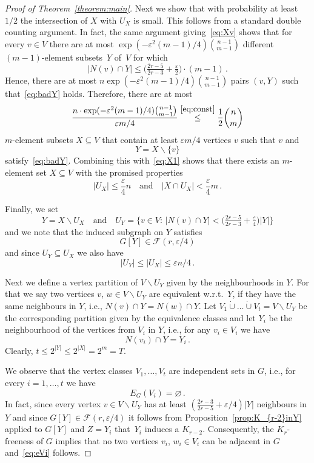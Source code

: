 \documentclass[reqno, 12pt]{amsart}
\theoremstyle{plain}
\theoremstyle{definition}
\let\eps=\varepsilon
\let\setminus=\smallsetminus
\let\emptyset=\varnothing
\begin{document}
\begin{proof}[Proof of Theorem~\ref{theorem:main}]
	Next we show that with probability at least $1/2$ the intersection 
	of $X$ with $U_X$ is small. This follows from a standard double counting argument.
	In fact, the same argument giving~\eqref{eq:Xv} shows that for every 
	$v\in V$ there are at most $\exp(-\eps^2(m-1)/4)\binom{n-1}{m-1}$
	different $(m-1)$-element subsets~$Y$ of~$V$ for which  
	\begin{equation}\label{eq:badY}
		|N(v)\cap Y|\leq\big(\tfrac{2r-5}{2r-3}+\tfrac{\eps}{2}\big)\cdot (m-1)\,.
	\end{equation}
	Hence, there are at most $n\exp(-\eps^2(m-1)/4)\binom{n-1}{m-1}$ pairs $(v,Y)$ 
	such that~\eqref{eq:badY}
	holds.
	Therefore, there are at most 
	\[
		\frac{n\cdot \exp(-\eps^2(m-1)/4)\binom{n-1}{m-1}}{\eps m/4}\overset{\eqref{eq:const}}{\leq}\frac{1}{2}\binom{n}{m}
	\] 
	$m$-element subsets $X\subseteq V$ that contain at least 
	$\eps m/4$ vertices $v$ such that $v$ and 
	\[
		Y=X\setminus\{v\}
	\]
	satisfy~\eqref{eq:badY}. Combining this with~\eqref{eq:X1} shows that there 
	exists an $m$-element set $X\subseteq V$ with the promised properties
	\[
		|U_X|\leq\frac{\eps}{4}n
		{\quad\text{and}\quad} 
		|X\cap U_X|< \frac{\eps}{4}m\,.
	\]
	
	Finally, we set 
	\[
		Y=X\setminus U_X {\quad\text{and}\quad} U_Y=\Big\{v\in V{\colon\,} |N(v)\cap Y|<\big(\tfrac{2r-5}{2r-3}+\tfrac{\eps}{4}\big)|Y|\Big\}
	\]
	and we note that the induced subgraph on $Y$  satisfies
	\[
		G[Y]\in{{\mathcal F}}(r,\eps/4)
	\]
	and since $U_Y\subseteq U_X$ we also have 
	\[
		|U_Y|\leq |U_X|\leq \eps n/4\,.
	\]
	
	
	Next we define a vertex partition of $V\setminus U_Y$ given by the neighbourhoods in $Y$.
	For that we say two vertices $v$, $w\in V\setminus U_Y$ are equivalent w.r.t.~$Y$,
	if they have the same neighbours in $Y$, i.e., $N(v)\cap Y=N(w)\cap Y$. Let 
	$V_1{\dot\cup}\dots{\dot\cup} V_t=V\setminus U_Y$ be the corresponding partition 
	given by the equivalence classes and let $Y_i$ be the neighbourhood 
	of the vertices from $V_i$ in $Y$, i.e., for any $v_i\in V_i$ we have 
	\[
		N(v_i)\cap Y=Y_i\,.
	\]
	Clearly, $t\leq 2^{|Y|}\leq 2^{|X|}=2^m= T$.

	We observe that the vertex classes $V_1,\dots,V_t$ are independent sets 
	in $G$, i.e., for every $i=1,\dots,t$ we have
	\begin{equation}\label{eq:eVi} 
		E_G(V_i)=\emptyset\,.
	\end{equation}
	In fact, since every vertex $v\in V\setminus U_Y$ has at least 
	$(\frac{2r-3}{2r-5}+\eps/4)|Y|$  neighbours in $Y$ and since $G[Y]\in{{\mathcal F}}(r,\eps/4)$ it follows from
	Proposition~\ref{prop:K_{r-2}inY} applied to $G[Y]$ and $Z=Y_i$ 
	that~$Y_i$ induces a $K_{r-2}$.
	Consequently, the $K_r$-freeness of $G$ 
	implies that no two vertices  $v_i$, $w_i\in V_i$
	can be adjacent in $G$ and~\eqref{eq:eVi} follows.
	

\end{proof}
\end{document}
